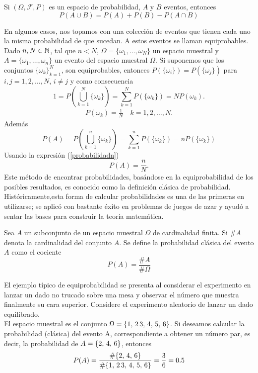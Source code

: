 \begin{Cor}
    Si $(\Omega,\mathscr{F},P)$ es un espacio de probabilidad, $A$ y $B$ eventos, entonces
    $$P(A\cup B)=P(A)+P(B)-P(A\cap B)$$
\end{Cor}
En algunos casos, nos topamos con una colección de eventos que tienen cada uno la misma probabilidad de que sucedan. A estos eventos se llaman equiprobables.
Dado $n,N\in{\mathbb{N}}$, tal que $n<N$, $\Omega=\{\omega_1,\ldots,\omega_N\}$ un espacio muestral y $A=\{\omega_1,\ldots,\omega_n\}$ un evento del espacio muestral $\Omega$.
Si suponemos que los conjuntos  $\{\omega_k\}_{k=1}^N$, son equiprobables, entonces $P(\{\omega_i\})=P(\{\omega_j\})$ para $i,j=1,2,\ldots,N$, $i\not=j$ y como consecuencia $$1=P(\bigcup_{k=1}^N \{\omega_k\})=\sum_{k=1}^N P(\{\omega_k\})=N P(\omega_k).$$
\begin{eqnarray}
    \label{probabilidadn}
    P(\omega_k)=\frac{1}{N}\quad k=1,2,\ldots ,N.
\end{eqnarray}
Además
$$P(A)=P(\bigcup_{k=1}^n \{\omega_k\})=\sum_{k=1}^n P(\{\omega_k\})=n P(\{\omega_k\})$$
Usando la expresión (\ref{probabilidadn})
$$P(A)=\frac{n}{N}.$$
Este método de encontrar probabilidades, basándose en la equiprobabilidad de los posibles resultados, es conocido como la definición clásica de probabilidad.\\
Históricamente,esta forma de calcular probabilidades es una de las primeras en utilizarse; se aplicó con bastante éxito en problemas de juegos de azar y ayudó a sentar las bases para construir la teoría matemática.
\begin{Def}
    Sea $A$ un subconjunto de un espacio muestral $\Omega$ de cardinalidad finita. Si $\#A$ denota la cardinalidad del conjunto $A$. Se define la probabilidad clásica del evento $A$ como el cociente $$P(A)=\frac{\#A}{\#\Omega}$$
    \label{defprobClásica}
\end{Def}
\begin{Ejm}
    El ejemplo típico de equiprobabilidad se presenta al considerar el experimento  en lanzar un dado no trucado sobre una mesa y observar el número que muestra finalmente su cara superior. Considere el experimento aleatorio de lanzar un dado equilibrado.\\ El espacio muestral es el conjunto  $\Omega=\{1,\thinspace 2\thinspace 3,\thinspace 4,\thinspace 5,\thinspace 6\}$. Si deseamos calcular la probabilidad (clásica) del evento A, correspondiente a obtener un número par, es decir, la probabilidad de $A=\{2,\thinspace 4,\thinspace 6\}$, entonces $$P(A)=\frac{\#\{2,\thinspace 4,\thinspace 6\}}{\#\{1,\thinspace 2\thinspace 3,\thinspace 4,\thinspace 5,\thinspace 6\}}=\frac{3}{6}=0.5$$
\end{Ejm}
